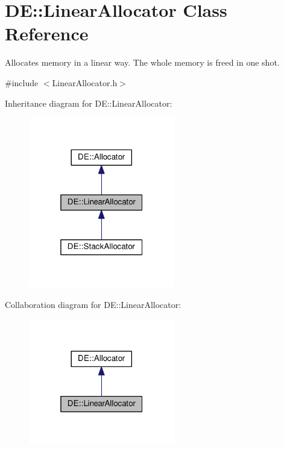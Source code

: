 \hypertarget{classDE_1_1LinearAllocator}{}\section{DE\+:\+:Linear\+Allocator Class Reference}
\label{classDE_1_1LinearAllocator}


Allocates memory in a linear way. The whole memory is freed in one shot.  




{\ttfamily \#include $<$Linear\+Allocator.\+h$>$}



Inheritance diagram for DE\+:\+:Linear\+Allocator\+:
\nopagebreak
\begin{figure}[H]
\begin{center}
\leavevmode
\includegraphics[width=181pt]{classDE_1_1LinearAllocator__inherit__graph}
\end{center}
\end{figure}


Collaboration diagram for DE\+:\+:Linear\+Allocator\+:\nopagebreak
\begin{figure}[H]
\begin{center}
\leavevmode
\includegraphics[width=181pt]{classDE_1_1LinearAllocator__coll__graph}
\end{center}
\end{figure}
